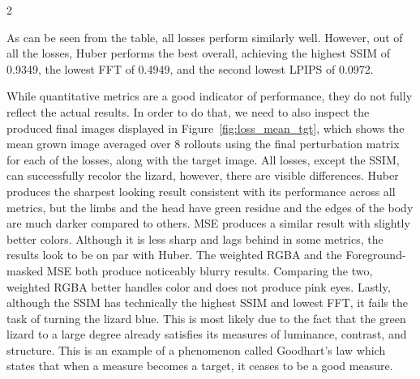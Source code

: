 \documentclass{article}
\begin{document}
\begin{multicols}{2}
\begin{table}[H]
\centering
{}
\caption{Fitness functions with their evaluation metrics. (lower) or (higher) determine if a smaller or larger scores are better. $\star$ means that the lizard did not turn blue.}
\label{tab:losses}
\end{table}


As can be seen from the table, all losses perform similarly well. However, out of all the losses, Huber performs the best overall, achieving the highest SSIM of 0.9349, the lowest FFT of 0.4949, and the second lowest LPIPS of 0.0972. 

While quantitative metrics are a good indicator of performance, they do not fully reflect the actual results. In order to do that, we need to also inspect the produced final images displayed in Figure~\ref{fig:loss_mean_tgt}, which shows the mean grown image averaged over 8 rollouts using the final perturbation matrix for each of the losses, along with the target image.
All losses, except the SSIM, can successfully recolor the lizard, however, there are visible differences.
Huber produces the sharpest looking result consistent with its performance across all metrics, but the limbs and the head have green residue and the edges of the body are much darker compared to others.
MSE produces a similar result with slightly better colors. Although it is less sharp and lags behind in some metrics, the results look to be on par with Huber.
The weighted RGBA and the Foreground-masked MSE both produce noticeably blurry results. Comparing the two, weighted RGBA better handles color and does not produce pink eyes.
Lastly, although the SSIM has technically the highest SSIM and lowest FFT, it fails the task of turning the lizard blue. This is most likely due to the fact that the green lizard to a large degree already satisfies its measures of luminance, contrast, and structure.
This is an example of a phenomenon called Goodhart's law \cite{strathern1997improving} which states that when a measure becomes a target, it ceases to be a good measure.



\end{multicols}
\end{document}
